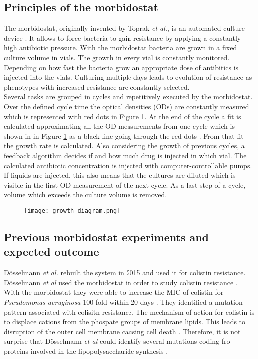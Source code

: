 \subsection{Principles of the morbidostat} 
The morbidostat, originally invented by Toprak \textit{et al.}, is an automated culture device \cite{toprak_building_2013}. It allows to force bacteria to gain resistance by applying a constantly high antibiotic pressure. With the morbidostat bacteria are grown in a fixed culture volume in vials. The growth in every vial is constantly monitored. Depending on how fast the bacteria grow an appropriate dose of antibitics is injected into the vials. Culturing multiple days leads to evolution of resistance as phenotypes with increased resistance are constantly selected. \\
Several tasks are grouped in cycles and repetitively executed by the morbidostat. Over the defined cycle time the optical densities (ODs) are constantly measured which is represented with red dots in Figure \ref{figure:principle}. At the end of the cycle a fit is calculated approximating all the OD measurements from one cycle which is shown in in Figure \ref{figure:principle} as a black line going through the red dots . From that fit the growth rate is calculated. Also considering the growth of previous cycles, a feedback algorithm decides if and how much drug is injected in which vial. The calculated antibiotic concentration is injected with computer-controllable pumps. If liquids are injected, this also means that the cultures are diluted which is visible in the first OD measurement of the next cycle. As a last step of a cycle, volume which exceeds the culture volume is removed.  
\begin{figure}
	\texttt{[image: growth\_diagram.png]}
	\caption{}
	\label{figure:principle}
\end{figure} 

\subsection{Previous morbidostat experiments and expected outcome}
Dösselmann \textit{et al.} rebuilt the system in 2015  \cite{doselmann_rapid_2017} and used it for colistin resistance. 
Dösselmann \textit{et al} used the morbidostat in order to study colistin resistance \cite{doselmann_rapid_2017}. With the morbidostat they were able to increase the MIC of colistin for \textit{Pseudomonas aeruginosa} 100-fold within 20 days \cite{doselmann_rapid_2017}. They identified a mutation pattern associated with colisitn resistance. The mechanism of action for colistin is to displace cations from the phospate groups of membrane lipids. This leads to disruption of the outer cell membrane causing cell death \cite{noauthor_colistin:_nodate}. Therefore, it is not surprise that Dösselmann \textit{et al} could identify several mutations coding fro proteins involved in the lipopolysaccharide synthesis \cite{doselmann_rapid_2017}.

